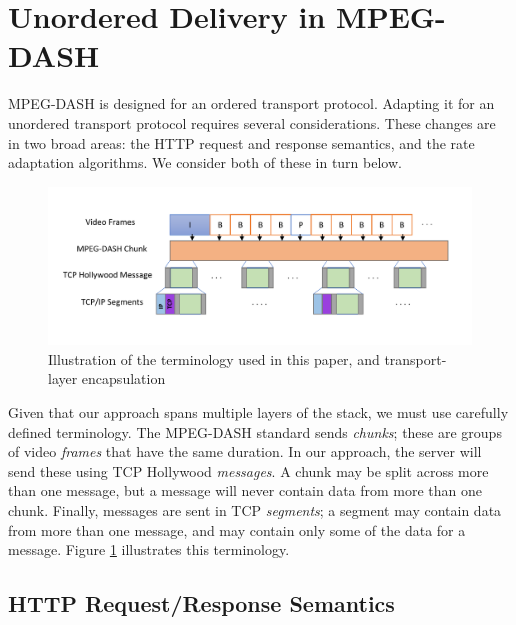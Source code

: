 \section{Unordered Delivery in MPEG-DASH}
\label{sec:transport}

MPEG-DASH is designed for an ordered transport protocol. Adapting it for an
unordered transport protocol requires several considerations. These
changes are in two broad areas: the HTTP request and response semantics, and the rate
adaptation algorithms. We consider both of these in turn below.

\begin{figure}
  \centering
  \includegraphics[width=\columnwidth]{figures/terminology2.pdf}
  \caption{Illustration of the terminology used in this paper, and transport-layer encapsulation}
  \label{fig:terminology}
\end{figure}

Given that our approach spans multiple layers of the stack, we must use carefully defined
terminology. The MPEG-DASH standard sends \emph{chunks}; these are groups of video
\emph{frames} that have the same duration. In our approach, the server will send these
using TCP Hollywood \emph{messages}. A chunk may be split across more than one message,
but a message will never contain data from more than one chunk. Finally, messages are
sent in TCP \emph{segments}; a segment may contain data from more than one message, and
may contain only some of the data for a message.
Figure \ref{fig:terminology} illustrates this terminology.

\subsection{HTTP Request/Response Semantics}

